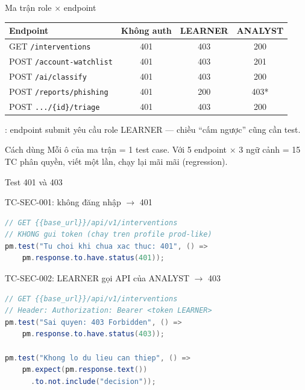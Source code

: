 \documentclass[aspectratio=169,12pt]{beamer}
\begin{document}
\begin{frame}{Ma trận role \(\times\) endpoint}
  \begin{center}
  \small
  \setlength{\tabcolsep}{5pt}
  \begin{tabular}{p{4.9cm}ccc}
    \toprule
    \textbf{Endpoint} & \textbf{Không auth} & \textbf{LEARNER} & \textbf{ANALYST} \\
    \midrule
    GET \texttt{/interventions}            & 401 & 403 & 200 \\
    POST \texttt{/account-watchlist}       & 401 & 403 & 201 \\
    POST \texttt{/ai/classify}             & 401 & 403 & 200 \\
    POST \texttt{/reports/phishing}        & 401 & 200 & 403* \\
    POST \texttt{.../\{id\}/triage}        & 401 & 403 & 200 \\
    \bottomrule
  \end{tabular}
  \end{center}

  \small *: endpoint submit yêu cầu role LEARNER --- chiều ``cấm ngược''
  cũng cần test.

  \begin{exampleblock}{Cách dùng}
    Mỗi ô của ma trận = 1 test case. Với 5 endpoint \(\times\) 3 ngữ cảnh
    = 15 TC phân quyền, viết một lần, chạy lại mãi mãi (regression).
  \end{exampleblock}
\end{frame}

\begin{frame}[fragile]{Test 401 và 403}
  \begin{block}{TC-SEC-001: không đăng nhập $\to$ 401}
\begin{lstlisting}[language=Java]
// GET {{base_url}}/api/v1/interventions
// KHONG gui token (chay tren profile prod-like)
pm.test("Tu choi khi chua xac thuc: 401", () =>
    pm.response.to.have.status(401));
\end{lstlisting}
  \end{block}

  \begin{block}{TC-SEC-002: LEARNER gọi API của ANALYST $\to$ 403}
\begin{lstlisting}[language=Java]
// GET {{base_url}}/api/v1/interventions
// Header: Authorization: Bearer <token LEARNER>
pm.test("Sai quyen: 403 Forbidden", () =>
    pm.response.to.have.status(403));

pm.test("Khong lo du lieu can thiep", () =>
    pm.expect(pm.response.text())
      .to.not.include("decision"));
\end{lstlisting}
  \end{block}
\end{frame}
\end{document}
